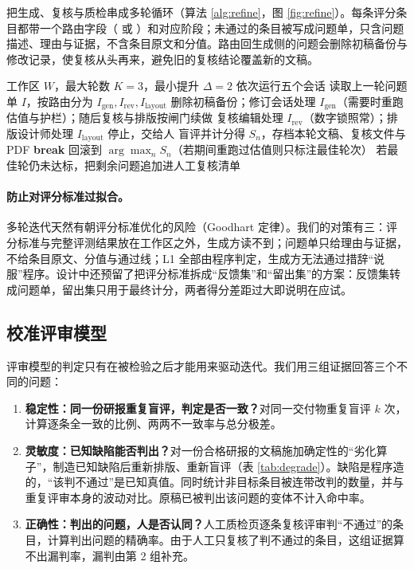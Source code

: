  把生成、复核与质检串成多轮循环（算法 \ref{alg:refine}，图 \ref{fig:refine}）。每条评分条目都带一个路由字段（ 或 ）和对应阶段；未通过的条目被写成问题单，只含问题描述、理由与证据，不含条目原文和分值。路由回生成侧的问题会删除初稿备份与修改记录，使复核从头再来，避免旧的复核结论覆盖新的文稿。

\begin{algorithm}[t]
\caption{质检闭环（）}
\label{alg:refine}
\small
\begin{algorithmic}[1]
\Require 工作区 $W$，最大轮数 $K=3$，最小提升 $\Delta=2$
   依次运行五个会话 
  \Else
    \State 读取上一轮问题单 $I$，按路由分为 $I_{\text{gen}}, I_{\text{rev}}, I_{\text{layout}}$
     删除初稿备份；修订会话处理 $I_{\text{gen}}$（需要时重跑估值与护栏）；随后复核与排版按闸门续做
    \Else{} 复核编辑处理 $I_{\text{rev}}$（数字锁照常）；排版设计师处理 $I_{\text{layout}}$
    \EndIf
  \EndIf
   停止，交给人 \EndIf
  \State 盲评并计分得 $S_n$，存档本轮文稿、复核文件与 PDF
   \textbf{break} \EndIf
\EndFor
\State 回滚到 $\arg\max_n S_n$（若期间重跑过估值则只标注最佳轮次）
\State 若最佳轮仍未达标，把剩余问题追加进人工复核清单
\end{algorithmic}
\end{algorithm}

\paragraph{防止对评分标准过拟合。}多轮迭代天然有朝评分标准优化的风险（Goodhart 定律）。我们的对策有三：评分标准与完整评测结果放在工作区之外，生成方读不到；问题单只给理由与证据，不给条目原文、分值与通过线；L1 全部由程序判定，生成方无法通过措辞“说服”程序。设计中还预留了把评分标准拆成“反馈集”和“留出集”的方案：反馈集转成问题单，留出集只用于最终计分，两者得分差距过大即说明在应试。

\subsection{校准评审模型}
\label{sec:calib-method}
评审模型的判定只有在被检验之后才能用来驱动迭代。我们用三组证据回答三个不同的问题：

\begin{enumerate}
  \item \textbf{稳定性：同一份研报重复盲评，判定是否一致？}对同一交付物重复盲评 $k$ 次，计算逐条全一致的比例、两两不一致率与总分极差。
  \item \textbf{灵敏度：已知缺陷能否判出？}对一份合格研报的文稿施加确定性的“劣化算子”，制造已知缺陷后重新排版、重新盲评（表 \ref{tab:degrade}）。缺陷是程序造的，“该判不通过”是已知真值。同时统计非目标条目被连带改判的数量，并与重复评审本身的波动对比。原稿已被判出该问题的变体不计入命中率。
  \item \textbf{正确性：判出的问题，人是否认同？}人工质检页逐条复核评审判“不通过”的条目，计算判出问题的精确率。由于人工只复核了判不通过的条目，这组证据算不出漏判率，漏判由第 2 组补充。
\end{enumerate}


